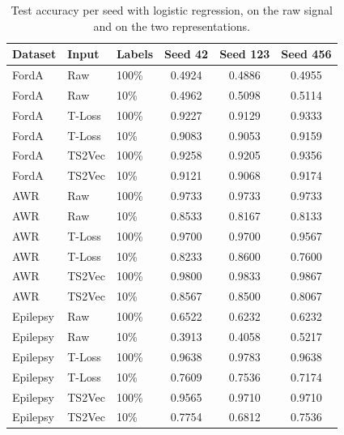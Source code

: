 \documentclass[a4paper,11pt]{article}
\begin{document}
\begin{table}[htbp]
    \centering
    \small
    \begin{tabular}{l l l c c c}
        \toprule
        Dataset & Input & Labels & Seed 42 & Seed 123 & Seed 456 \\
        \midrule
        FordA & Raw    & 100\% & 0.4924 & 0.4886 & 0.4955 \\
        FordA & Raw    & 10\%  & 0.4962 & 0.5098 & 0.5114 \\
        FordA & T-Loss & 100\% & 0.9227 & 0.9129 & 0.9333 \\
        FordA & T-Loss & 10\%  & 0.9083 & 0.9053 & 0.9159 \\
        FordA & TS2Vec & 100\% & 0.9258 & 0.9205 & 0.9356 \\
        FordA & TS2Vec & 10\%  & 0.9121 & 0.9068 & 0.9174 \\
        \midrule
        AWR & Raw    & 100\% & 0.9733 & 0.9733 & 0.9733 \\
        AWR & Raw    & 10\%  & 0.8533 & 0.8167 & 0.8133 \\
        AWR & T-Loss & 100\% & 0.9700 & 0.9700 & 0.9567 \\
        AWR & T-Loss & 10\%  & 0.8233 & 0.8600 & 0.7600 \\
        AWR & TS2Vec & 100\% & 0.9800 & 0.9833 & 0.9867 \\
        AWR & TS2Vec & 10\%  & 0.8567 & 0.8500 & 0.8067 \\
        \midrule
        Epilepsy & Raw    & 100\% & 0.6522 & 0.6232 & 0.6232 \\
        Epilepsy & Raw    & 10\%  & 0.3913 & 0.4058 & 0.5217 \\
        Epilepsy & T-Loss & 100\% & 0.9638 & 0.9783 & 0.9638 \\
        Epilepsy & T-Loss & 10\%  & 0.7609 & 0.7536 & 0.7174 \\
        Epilepsy & TS2Vec & 100\% & 0.9565 & 0.9710 & 0.9710 \\
        Epilepsy & TS2Vec & 10\%  & 0.7754 & 0.6812 & 0.7536 \\
        \bottomrule
    \end{tabular}
    \caption{Test accuracy per seed with logistic regression, on the raw signal and on the two representations.}
    \label{tab:per-seed}
\end{table}
\end{document}
